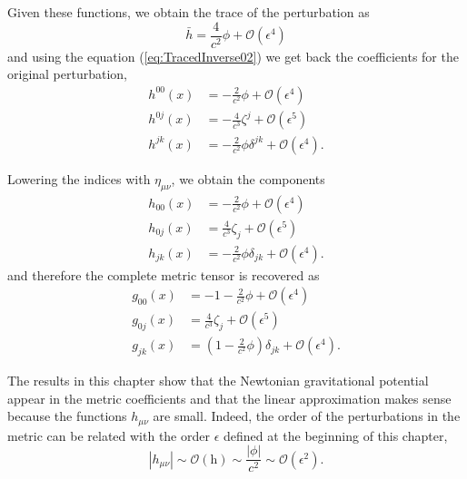 Given these functions, we obtain the trace of the perturbation as
\begin{equation}
\bar{h} =  \frac{4}{c^2} \phi + \mathcal{O} \left( \epsilon^4 \right)
\end{equation}
and using the equation (\ref{eq:TracedInverse02}) we get back the coefficients for the original perturbation,
\begin{subequations}
\begin{align}
h^{00} (x) &= -\frac{2}{c^2} \phi + \mathcal{O} \left( \epsilon^4 \right)\\
h^{0j} (x) &=  -\frac{4}{c^3} \zeta^j + \mathcal{O} \left( \epsilon^5 \right)  \\
h^{jk} (x) &= -\frac{2}{c^2} \phi \delta^{jk} + \mathcal{O} \left( \epsilon^4 \right).
\end{align}
\end{subequations}

Lowering the indices  with $\eta_{\mu \nu}$, we obtain the components 
\begin{subequations}
\begin{align}
h_{00} (x) &= -\frac{2}{c^2} \phi + \mathcal{O} \left( \epsilon^4 \right) \label{eq:00ComponentNewtonian} \\
h_{0j} (x) &=  \frac{4}{c^3} \zeta_j + \mathcal{O} \left( \epsilon^5 \right) \label{eq:0jComponentNewtonian}  \\ 
h_{jk} (x) &= -\frac{2}{c^2} \phi \delta_{jk} + \mathcal{O} \left( \epsilon^4 \right). \label{eq:jkComponentNewtonian}
\end{align}
\end{subequations}
and therefore the complete metric tensor is recovered as
\begin{subequations}\label{eq:NewtonianMetric}
\begin{align}
g_{00} (x) &= -1 -\frac{2}{c^2} \phi + \mathcal{O} \left( \epsilon^4 \right) \label{eq:NewtonianMetric1}\\
g_{0j} (x) &=   \frac{4}{c^3} \zeta_j + \mathcal{O} \left( \epsilon^5 \right) \label{eq:NewtonianMetric2}  \\
g_{jk} (x) &=  \left(1 - \frac{2}{c^2} \phi \right) \delta_{jk}  + \mathcal{O} \left( \epsilon^4 \right)\label{eq:NewtonianMetric3}.
\end{align}
\end{subequations}

The results in this chapter show that the Newtonian gravitational potential appear in the metric coefficients and that the linear approximation makes sense because the functions $h_{\mu \nu}$ are small. Indeed, the order of the perturbations in the metric can be related with the order $\epsilon$ defined at the beginning of this chapter,
\begin{equation}
\left| h_{\mu \nu} \right| \sim \mathcal{O} \left( \textrm{h} \right) \sim \frac{\left| \phi \right|}{c^2} \sim \mathcal{O} (\epsilon^2). \label{eq:NewtonianPotentialOrder}
\end{equation}

